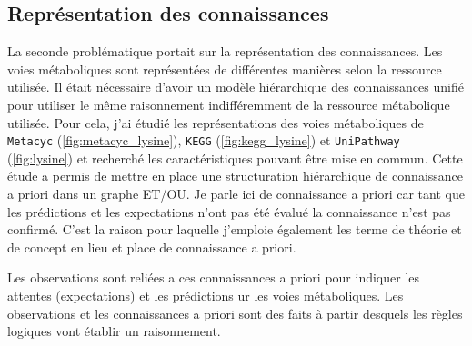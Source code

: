 \begin{refsegment}
\subsection{Représentation des connaissances}

La seconde problématique portait sur la représentation des connaissances. Les voies métaboliques sont représentées de différentes manières selon la ressource utilisée. Il était nécessaire d'avoir un modèle hiérarchique des connaissances unifié pour utiliser le même raisonnement indifféremment de la ressource métabolique utilisée. Pour cela, j'ai étudié les représentations des voies métaboliques de \texttt{Metacyc} (\cref{fig:metacyc_lysine}), \texttt{KEGG} (\cref{fig:kegg_lysine}) et \texttt{UniPathway} (\cref{fig:lysine}) et recherché les caractéristiques pouvant être mise en commun. Cette étude a permis de mettre en place une structuration hiérarchique de connaissance a priori dans un graphe ET/OU. Je parle ici de connaissance a priori car tant que les prédictions et les expectations n'ont pas été évalué la connaissance n'est pas confirmé. C'est la raison pour laquelle j'emploie également les terme de théorie et de concept en lieu et place de connaissance a priori. 

Les observations sont reliées a ces connaissances a priori pour indiquer les attentes (expectations)  et les prédictions ur les voies métaboliques. Les observations et les connaissances a priori sont des faits à partir desquels les règles logiques vont établir un raisonnement. 


\end{refsegment}

